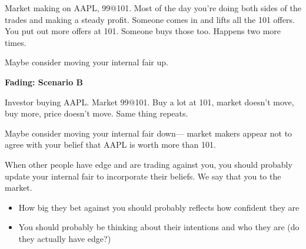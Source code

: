 Market making on AAPL, 99@101. Most of the day you're doing both sides of the trades and making a steady profit. Someone comes in and lifts all the 101 offers. You put out more offers at 101. Someone buys those too. Happens two more times. 

Maybe consider moving your internal fair up.

\textbf{Fading: Scenario B}

Investor buying AAPL. Market 99@101. Buy a lot at 101, market doesn't move, buy more, price doesn't move. Same thing repeats.

Maybe consider moving your internal fair down— market makers appear not to agree with your belief that AAPL is worth more than 101.

When other people have edge and are trading against you, you should probably update your internal fair to incorporate their beliefs. We say that you  to the market.
\begin{itemize}
    \item How big they bet against you should probably reflects how confident they are
    \item You should probably be thinking about their intentions and who they are (do they actually have edge?)
\end{itemize}

